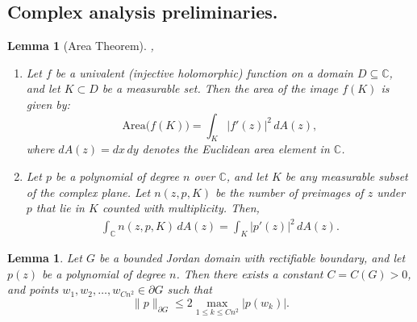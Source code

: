 \documentclass[9pt,a4paper,reqno]{amsart}
\theoremstyle{mine}
\newtheorem{Lemma}[thm]{Lemma}
\theoremstyle{definition}
\theoremstyle{remark}
\newcommand{\mb}{\mathbb}
\begin{document}
\subsection{Complex analysis preliminaries.}
\begin{Lemma} [Area Theorem] \cite[Section-$2.4$]{Ahlfors}, \cite[Theorem $3$]{crane-polynomialpreimage} \label{area Lemma}
\begin{enumerate}[label=(\alph*)]
\item Let \( f \) be a univalent (injective holomorphic) function on a domain \( D \subseteq \mathbb{C} \), and let \( K \subset D \) be a measurable set. Then the area of the image \( f(K) \) is given by:
\[
\text{Area}\big(f(K)\big) = \int_K |f'(z)|^2 \, dA(z),
\]
where \( dA(z) = dx \, dy \) denotes the Euclidean area element in \( \mathbb{C} \).
\item Let \( p \) be a polynomial of degree \( n \) over \( \mathbb{C} \), and let \( K \) be any measurable subset of the complex plane. Let \( n(z, p, K) \) be the number of preimages of \( z \) under \( p \) that lie in \( K \) counted with multiplicity. Then,
\begin{align}
    \int_{\mathbb{C}} n(z, p, K)\, dA(z) = \int_K |p'(z)|^2\, dA(z).
\end{align}
\end{enumerate}
\end{Lemma}


\begin{Lemma} \cite[Lemma ~2.2]{KLR}\label{Sup bound of polynomials}
Let $G$ be a bounded Jordan domain with rectifiable boundary, and let $p(z)$ be a polynomial 
of degree $n$. Then there exists a constant $C = C(G) > 0$, and points 
$w_1, w_2, \ldots, w_{Cn^2} \in \partial G$ such that 
\begin{equation} \label{eq:lemma2.2}
    \|p\|_{\partial G} \leq 2 \max_{1 \leq k \leq Cn^2} |p(w_k)|.
\end{equation}
\end{Lemma}

\end{document}
